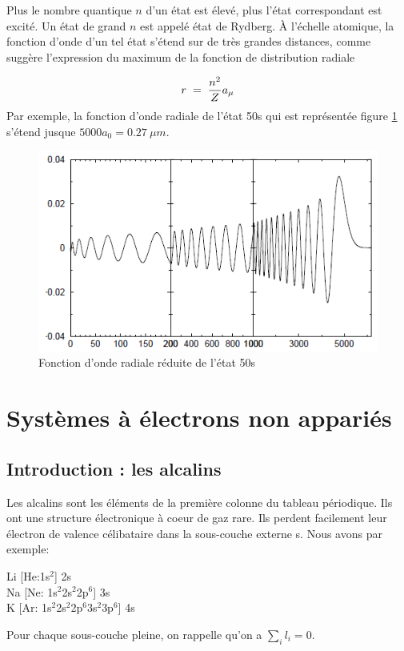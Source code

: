 Plus le nombre quantique $n$ d'un état est élevé, plus l'état correspondant est excité. Un état de grand $n$ est appelé état de Rydberg. À l'échelle atomique, la fonction d'onde d'un tel état s'étend sur de très grandes distances, comme suggère l'expression du maximum de la fonction de distribution radiale

\[
    r\; = \; \dfrac{n^2}{Z}a_{\mu}
\]
Par exemple, la fonction d'onde radiale de l'état 50s qui est représentée figure \ref{fig:50s} s'étend jusque $5000a_0= \SI{0.27}{\mu m}$.

\begin{figure}[htp]
    \centering
    \includegraphics{Images2/50s.PNG}
    \caption{Fonction d'onde radiale réduite de l'état 50s}
    \label{fig:50s}
\end{figure}





\newpage

\section{Systèmes à électrons non appariés}
\subsection{Introduction : les alcalins}

Les alcalins sont les éléments de la première colonne du tableau périodique. Ils ont une structure électronique à coeur de gaz rare. Ils perdent facilement leur électron de valence célibataire dans la sous-couche externe s. Nous avons par exemple:

\begin{center}
    Li [He:1s$^{2}$] 2s \\
    Na [Ne: 1s$^{2}$2s$^{2}$2p$^{6}$] 3s \\
    K [Ar: 1s$^{2}$2s$^{2}$2p$^{6}$3s$^{2}$3p$^{6}$] 4s
\end{center}
Pour chaque sous-couche pleine, on rappelle qu'on a $\sum_i l_i = 0$.

